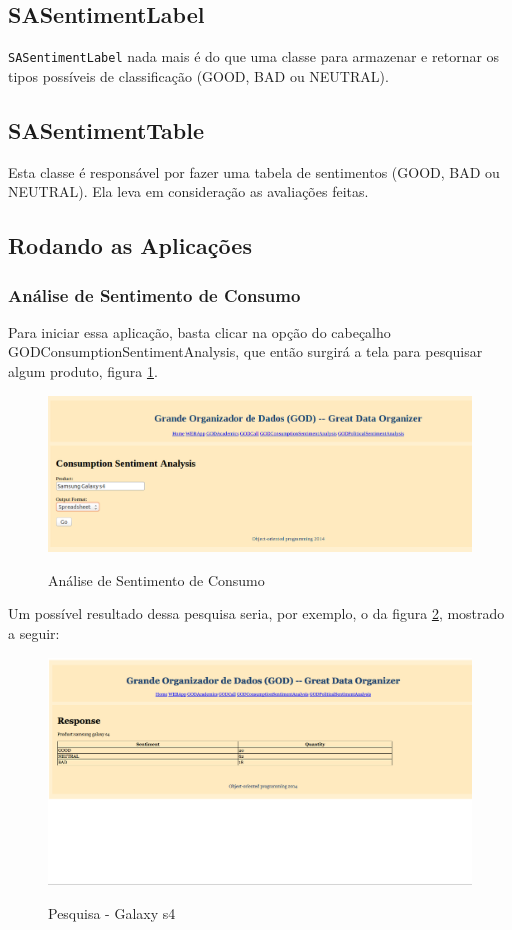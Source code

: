 \subsection{SASentimentLabel}
\texttt{SASentimentLabel} nada mais é do que uma classe para armazenar e retornar os tipos possíveis de classificação (GOOD, BAD ou NEUTRAL).

\subsection{SASentimentTable}
Esta classe é responsável por fazer uma tabela de sentimentos (GOOD, BAD ou NEUTRAL). Ela leva em consideração as avaliações feitas.

\subsection{Rodando as Aplicações}

\subsubsection{Análise de Sentimento de Consumo}
Para iniciar essa aplicação, basta clicar na opção do cabeçalho GODConsumptionSentimentAnalysis, que então surgirá a tela para pesquisar algum produto, figura \ref{fig:cons-pesq}.

\begin{figure}[h!]
\caption{Análise de Sentimento de Consumo}
\centering
\includegraphics[width=14cm]{figures/consumo-pesquisa.png}
\label{fig:cons-pesq}
\end{figure}

Um possível resultado dessa pesquisa seria, por exemplo, o da figura \ref{fig:cons-result}, mostrado a seguir:

\begin{figure}[h!]
\caption{Pesquisa - Galaxy s4}
\centering
\includegraphics[width=14cm]{figures/consumo-resultado.png}
\label{fig:cons-result}
\end{figure}


